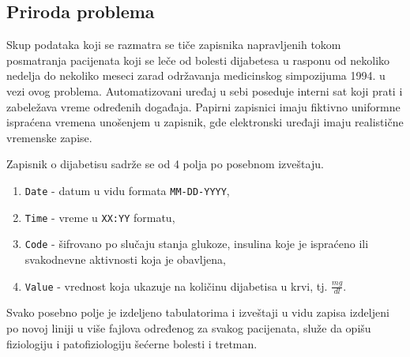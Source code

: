 \documentclass[fontsize=12bp, paper=a4]{scrarticle}
\begin{document}

\subsection{Priroda problema}
Skup podataka koji se razmatra se tiče zapisnika napravljenih tokom posmatranja pacijenata koji se leče od bolesti dijabetesa u rasponu od nekoliko nedelja do nekoliko meseci zarad održavanja medicinskog simpozijuma 1994. u vezi ovog problema.\cite{diabetes} Automatizovani uređaj u sebi poseduje interni sat koji prati i zabeležava vreme određenih događaja. Papirni zapisnici imaju fiktivno uniformne ispraćena vremena unošenjem u zapisnik, gde elektronski uređaji imaju realistične vremenske zapise. 

Zapisnik o dijabetisu sadrže se od 4 polja po posebnom izveštaju.

\begin{enumerate}
    \itemsep0em
    \item \verb|Date| - datum u vidu formata \verb|MM-DD-YYYY|,
    \item \verb|Time| - vreme u \verb|XX:YY| formatu,
    \item \verb|Code| - šifrovano po slučaju stanja glukoze, insulina koje je ispraćeno ili svakodnevne aktivnosti koja je obavljena,
    \item \verb|Value| - vrednost koja ukazuje na količinu dijabetisa u krvi, tj. $\frac{mg}{dl}$.
\end{enumerate}

Svako posebno polje je izdeljeno tabulatorima i izveštaji u vidu zapisa izdeljeni po novoj liniji u više fajlova određenog za svakog pacijenata, služe da opišu fiziologiju i patofiziologiju šećerne bolesti i tretman.
\end{document}
